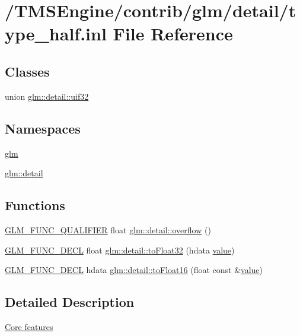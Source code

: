 \hypertarget{type__half_8inl}{}\section{/\+T\+M\+S\+Engine/contrib/glm/detail/type\+\_\+half.inl File Reference}
\label{type__half_8inl}
\subsection*{Classes}
\begin{DoxyCompactItemize}
\item 
union \hyperlink{unionglm_1_1detail_1_1uif32}{glm\+::detail\+::uif32}
\end{DoxyCompactItemize}
\subsection*{Namespaces}
\begin{DoxyCompactItemize}
\item 
 \hyperlink{namespaceglm}{glm}
\item 
 \hyperlink{namespaceglm_1_1detail}{glm\+::detail}
\end{DoxyCompactItemize}
\subsection*{Functions}
\begin{DoxyCompactItemize}
\item 
\hyperlink{setup_8hpp_a33fdea6f91c5f834105f7415e2a64407}{G\+L\+M\+\_\+\+F\+U\+N\+C\+\_\+\+Q\+U\+A\+L\+I\+F\+I\+ER} float \hyperlink{namespaceglm_1_1detail_a61efe122333bc00e81c57e0927bfdfb3}{glm\+::detail\+::overflow} ()
\item 
\hyperlink{setup_8hpp_ab2d052de21a70539923e9bcbf6e83a51}{G\+L\+M\+\_\+\+F\+U\+N\+C\+\_\+\+D\+E\+CL} float \hyperlink{namespaceglm_1_1detail_a8e4719d94d99ee1e625496e04317272b}{glm\+::detail\+::to\+Float32} (hdata \hyperlink{_s_d_l__opengl__glext_8h_a8ad81492d410ff2ac11f754f4042150f}{value})
\item 
\hyperlink{setup_8hpp_ab2d052de21a70539923e9bcbf6e83a51}{G\+L\+M\+\_\+\+F\+U\+N\+C\+\_\+\+D\+E\+CL} hdata \hyperlink{namespaceglm_1_1detail_ac16321696a34b41c55f941b319d50652}{glm\+::detail\+::to\+Float16} (float const \&\hyperlink{_s_d_l__opengl__glext_8h_a8ad81492d410ff2ac11f754f4042150f}{value})
\end{DoxyCompactItemize}


\subsection{Detailed Description}
\hyperlink{group__core}{Core features} 